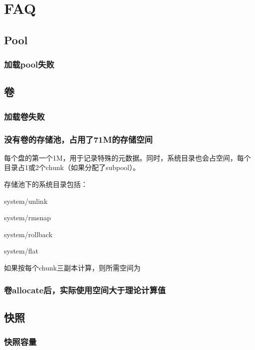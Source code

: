 \chapter{FAQ}

\section{Pool}

\subsection{加载pool失败}

\section{卷}

\subsection{加载卷失败}

\subsection{没有卷的存储池，占用了71M的存储空间}

每个盘的第一个1M，用于记录特殊的元数据。同时，系统目录也会占空间，每个目录占1或2个chunk（如果分配了subpool）。

存储池下的系统目录包括：
\begin{compactitem}
\item system/unlink
\item system/rmsnap
\item system/rollback
\item system/flat
\end{compactitem}

如果按每个chunk三副本计算，则所需空间为

\subsection{卷allocate后，实际使用空间大于理论计算值}

\section{快照}

\subsection{快照容量}
